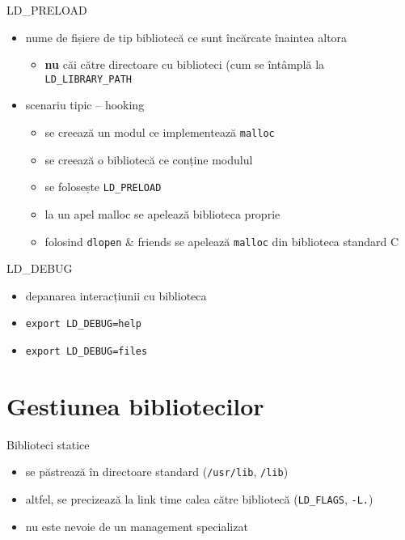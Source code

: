 \documentclass{beamer}
\begin{document}
\begin{frame}{LD\_PRELOAD}
  \begin{itemize}
    \item nume de fișiere de tip bibliotecă ce sunt încărcate înaintea altora
      \begin{itemize}
        \item \textbf{nu} căi către directoare cu biblioteci (cum se întâmplă
        la \texttt{LD\_LIBRARY\_PATH}
      \end{itemize}
    \item scenariu tipic -- hooking
      \begin{itemize}
        \item se creează un modul ce implementează \texttt{malloc}
        \item se creează o bibliotecă ce conține modulul
        \item se folosește \texttt{LD\_PRELOAD}
        \item la un apel malloc se apelează biblioteca proprie
        \item folosind \texttt{dlopen} \& friends se apelează \texttt{malloc}
        din biblioteca standard C
      \end{itemize}
  \end{itemize}
\end{frame}

\begin{frame}{LD\_DEBUG}
  \begin{itemize}
    \item depanarea interacțiunii cu biblioteca
    \item \texttt{export LD\_DEBUG=help}
    \item \texttt{export LD\_DEBUG=files}
  \end{itemize}
\end{frame}

\section{Gestiunea bibliotecilor}

\begin{frame}{Biblioteci statice}
  \begin{itemize}
    \item se păstrează în directoare standard (\texttt{/usr/lib},
    \texttt{/lib})
    \item altfel, se precizează la link time calea către bibliotecă
    (\texttt{LD\_FLAGS}, \texttt{-L.})
    \item nu este nevoie de un management specializat
  \end{itemize}
\end{frame}
\end{document}
